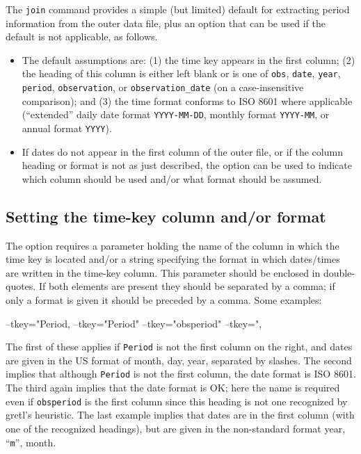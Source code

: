 The \texttt{join} command provides a simple (but limited) default for
extracting period information from the outer data file, plus an
option that can be used if the default is not applicable, as follows.
\begin{itemize}
\item The default assumptions are: (1) the time key appears in the
  first column; (2) the heading of this column is either left blank or
  is one of \texttt{obs}, \texttt{date}, \texttt{year},
  \texttt{period}, \texttt{observation}, or \verb|observation_date|
  (on a case-insensitive comparison); and (3) the time format conforms
  to ISO 8601 where applicable (``extended'' daily date format
  \texttt{YYYY-MM-DD}, monthly format \texttt{YYYY-MM}, or annual
  format \texttt{YYYY}).
\item If dates do not appear in the first column of the outer file, or
  if the column heading or format is not as just described, the
   option can be used to indicate which column should be
  used and/or what format should be assumed.
\end{itemize}

\subsection{Setting the time-key column and/or format}

The  option requires a parameter holding the name of the
column in which the time key is located and/or a string specifying the
format in which dates/times are written in the time-key column. This
parameter should be enclosed in double-quotes. If both elements are
present they should be separated by a comma; if only a format is given
it should be preceded by a comma. Some examples:

\begin{code}
--tkey="Period,%
--tkey="Period"
--tkey="obsperiod"
--tkey=",%
\end{code}

The first of these applies if \texttt{Period} is not the first column
on the right, and dates are given in the US format of month, day,
year, separated by slashes. The second implies that although
\texttt{Period} is not the first column, the date format is ISO 8601.
The third again implies that the date format is OK; here the name is
required even if \texttt{obsperiod} is the first column since this
heading is not one recognized by gretl's heuristic. The last example
implies that dates are in the first column (with one of the recognized
headings), but are given in the non-standard format year,
``\texttt{m}'', month.

